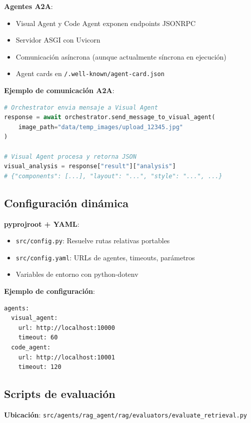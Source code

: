 \documentclass[12pt,a4paper]{article}
\begin{document}
\textbf{Agentes A2A}:
\begin{itemize}
    \item Visual Agent y Code Agent exponen endpoints JSONRPC
    \item Servidor ASGI con Uvicorn
    \item Comunicación asíncrona (aunque actualmente síncrona en ejecución)
    \item Agent cards en \texttt{/.well-known/agent-card.json}
\end{itemize}

\textbf{Ejemplo de comunicación A2A}:
\begin{lstlisting}[language=Python,caption={Llamada A2A desde Orchestrator}]
# Orchestrator envia mensaje a Visual Agent
response = await orchestrator.send_message_to_visual_agent(
    image_path="data/temp_images/upload_12345.jpg"
)

# Visual Agent procesa y retorna JSON
visual_analysis = response["result"]["analysis"]
# {"components": [...], "layout": "...", "style": "...", ...}
\end{lstlisting}

\subsection{Configuración dinámica}

\textbf{pyprojroot + YAML}:
\begin{itemize}
    \item \texttt{src/config.py}: Resuelve rutas relativas portables
    \item \texttt{src/config.yaml}: URLs de agentes, timeouts, parámetros
    \item Variables de entorno con python-dotenv
\end{itemize}

\textbf{Ejemplo de configuración}:
\begin{lstlisting}[caption={config.yaml - Endpoints Agentes}]
agents:
  visual_agent:
    url: http://localhost:10000
    timeout: 60
  code_agent:
    url: http://localhost:10001
    timeout: 120
\end{lstlisting}

\subsection{Scripts de evaluación}

\textbf{Ubicación}: \texttt{src/agents/rag\_agent/rag/evaluators/evaluate\_retrieval.py}
\end{document}
